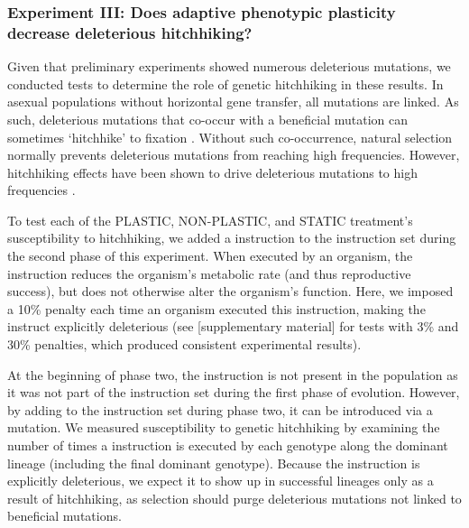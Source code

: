 \vspace{0.5cm}
\subsubsection{Experiment III: Does adaptive phenotypic plasticity decrease deleterious hitchhiking?}
\label{sec:methods:experiment-deleterious-hitchhiking}

Given that preliminary experiments showed numerous deleterious mutations, we conducted tests to determine the role of genetic hitchhiking in these results.
In asexual populations without horizontal gene transfer, all mutations are linked.
As such, deleterious mutations that co-occur with a beneficial mutation can sometimes `hitchhike' to fixation \citep{smith_hitch-hiking_1974,van_den_bergh_experimental_2018}.
Without such co-occurrence, natural selection normally prevents deleterious mutations from reaching high frequencies. 
However, hitchhiking effects have been shown to drive deleterious mutations to high frequencies \citep{buskirk_hitchhiking_2017}. %

To test each of the PLASTIC, NON-PLASTIC, and STATIC treatment's susceptibility to hitchhiking, we added a  instruction to the instruction set during the second phase of this experiment.
When executed by an organism, the  instruction reduces the organism's metabolic rate (and thus reproductive success), but does not otherwise alter the organism's function.
Here, we imposed a 10\% penalty each time an organism executed this instruction, making the instruct explicitly deleterious (see [supplementary material] for tests with 3\% and 30\% penalties, which produced consistent experimental results).

At the beginning of phase two, the  instruction is not present in the population as it was not part of the instruction set during the first phase of evolution.
However, by adding  to the instruction set during phase two, it can be introduced via a mutation.
We measured susceptibility to genetic hitchhiking by examining the number of times a  instruction is executed by each genotype along the dominant lineage (including the final dominant genotype).
Because the  instruction is explicitly deleterious, we expect it to show up in successful lineages only as a result of hitchhiking, as selection should purge deleterious mutations not linked to beneficial mutations.

\vspace{0.5cm}
